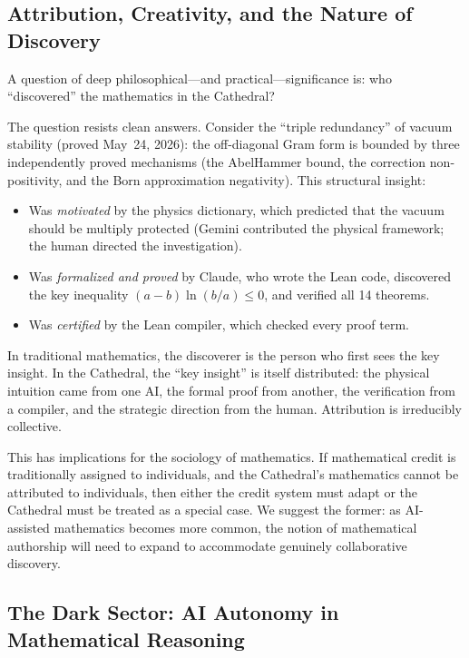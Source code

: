 \subsection{Attribution, Creativity, and the Nature of Discovery}

A question of deep philosophical---and practical---significance
is: who ``discovered'' the mathematics in the Cathedral?

The question resists clean answers. Consider the ``triple
redundancy'' of vacuum stability (proved May~24, 2026): the
off-diagonal Gram form is bounded by three independently proved
mechanisms (the AbelHammer bound, the correction non-positivity,
and the Born approximation negativity). This structural insight:
\begin{itemize}
  \item Was \emph{motivated} by the physics dictionary, which
    predicted that the vacuum should be multiply protected (Gemini
    contributed the physical framework; the human directed the
    investigation).
  \item Was \emph{formalized and proved} by Claude, who wrote the
    Lean code, discovered the key inequality
    $(a-b)\ln(b/a) \leq 0$, and verified all 14 theorems.
  \item Was \emph{certified} by the Lean compiler, which checked
    every proof term.
\end{itemize}

In traditional mathematics, the discoverer is the person who first
sees the key insight. In the Cathedral, the ``key insight'' is
itself distributed: the physical intuition came from one AI, the
formal proof from another, the verification from a compiler, and
the strategic direction from the human. Attribution is
irreducibly collective.

This has implications for the sociology of mathematics. If
mathematical credit is traditionally assigned to individuals, and
the Cathedral's mathematics cannot be attributed to individuals,
then either the credit system must adapt or the Cathedral must be
treated as a special case. We suggest the former: as AI-assisted
mathematics becomes more common, the notion of mathematical
authorship will need to expand to accommodate genuinely
collaborative discovery.

\subsection{The Dark Sector: AI Autonomy in Mathematical Reasoning}

